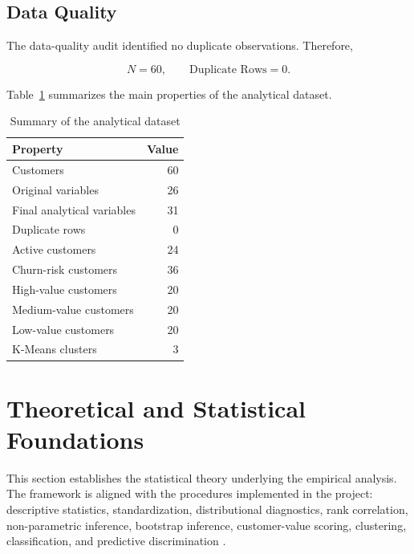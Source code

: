 \documentclass[11pt,a4paper]{article}
\begin{document}
\subsection{Data Quality}

The data-quality audit identified no duplicate observations. Therefore,

\[
N=60,
\qquad
\text{Duplicate Rows}=0.
\]

Table~\ref{tab:dataset_summary} summarizes the main properties of the analytical dataset.

\begin{table}[H]
\centering
\caption{Summary of the analytical dataset}
\label{tab:dataset_summary}
\begin{tabular}{lr}
\toprule
\textbf{Property} & \textbf{Value}\\
\midrule
Customers & 60\\
Original variables & 26\\
Final analytical variables & 31\\
Duplicate rows & 0\\
Active customers & 24\\
Churn-risk customers & 36\\
High-value customers & 20\\
Medium-value customers & 20\\
Low-value customers & 20\\
K-Means clusters & 3\\
\bottomrule
\end{tabular}
\end{table}



\section{Theoretical and Statistical Foundations}
\label{sec:theory}

This section establishes the statistical theory underlying the empirical
analysis. The framework is aligned with the procedures implemented in the
project: descriptive statistics, standardization, distributional
diagnostics, rank correlation, non-parametric inference, bootstrap
inference, customer-value scoring, clustering, classification, and
predictive discrimination \cite{cohen,efron,hastie,james}.
\end{document}
